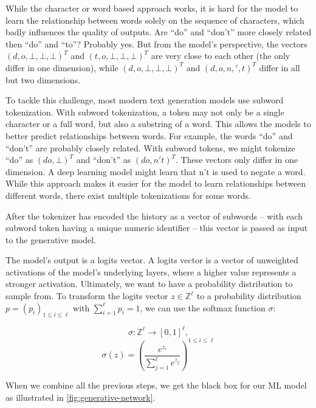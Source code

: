 While the character or word based approach works, it is hard for the model to learn the relationship between words solely on the sequence of characters, which badly influences the quality of outputs.
Are ``do'' and ``don't'' more closely related then ``do'' and ``to''?
Probably yes.
But from the model's perspective, the vectors $(d, o, \bot, \bot, \bot)^T$ and $(t, o, \bot, \bot, \bot)^T$ are very close to each other (the only differ in one dimension), while $(d, o, \bot, \bot, \bot)^T$ and $(d, o, n, ', t)^T$ differ in all but two dimensions.

To tackle this challenge, most modern text generation models use subword tokenization.
With subword tokenization, a token may not only be a single character or a full word, but also a substring of a word.
This allows the models to better predict relationships between words.
For example, the words ``do'' and ``don't'' are probably closely related.
With subword tokens, we might tokenize ``do'' as $(do, \bot)^T$ and ``don't'' as $(do, n't)^T$.
These vectors only differ in one dimension.
A deep learning model might learn that n't is used to negate a word.
While this approach makes it easier for the model to learn relationships between different words, there exist multiple tokenizations for some words.

After the tokenizer has encoded the history as a vector of subwords -- with each subword token having a unique numeric identifier -- this vector is passed as input to the generative model.

The model's output is a logits vector.
A logits vector is a vector of unweighted activations of the model's underlying layers, where a higher value represents a stronger activation.
Ultimately, we want to have a probability distribution to sample from.
To transform the logits vector $z \in \mathbb{Z}^\ell$ to a probability distribution $p = (p_i)_{1 \leq i \leq \ell}$ with $\sum_{i=1}^{\ell} p_i = 1$, we can use the softmax function $\sigma$:

$$\sigma \colon \mathbb{Z}^{\ell} \rightarrow [0,1]^{\ell},$$
$$\sigma(z) = \left(\frac{e^{z_i}}{\sum_{j=1}^{\ell} e^{z_j}}\right)^{1 \leq i \leq \ell}$$

When we combine all the previous steps, we get the black box for our ML model as illustrated in \autoref{fig:generative-network}.

